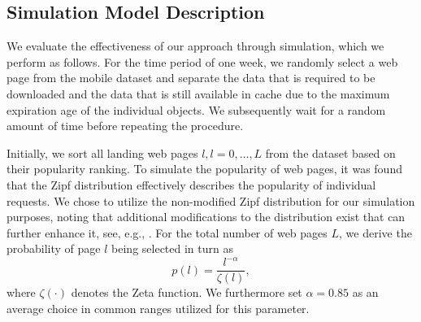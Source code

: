 \documentclass[letterpaper,conference]{IEEEtran}
\begin{document}
\subsection{Simulation Model Description}
We evaluate the effectiveness of our approach through simulation, which we perform as follows.
For the time period of one week, we randomly select a web page from the mobile dataset and separate the data that is required to be downloaded and the data that is still available in cache due to the maximum expiration age of the individual objects. 
We subsequently wait for a random amount of time before repeating the procedure.


Initially, we sort all landing web pages $l, l=0,\ldots,L$ from the 
dataset based on their popularity ranking.
To simulate the popularity of web pages, it was found that the Zipf distribution effectively describes the popularity of individual requests. %
We chose to utilize the non-modified Zipf distribution for our simulation purposes, noting that additional modifications to the distribution exist that can further enhance it, see, e.g., \cite{KrTeSh06}.
For the total number of web pages $L$, we derive the probability of page $l$ being selected in turn as
\begin{equation}
p(l)=\frac{l^{-\alpha}}{\zeta(l)},
\end{equation}
where $\zeta(\cdot)$ denotes the Zeta function. 
We furthermore set $\alpha=0.85$ as an average choice in common ranges utilized for this parameter.
\end{document}

